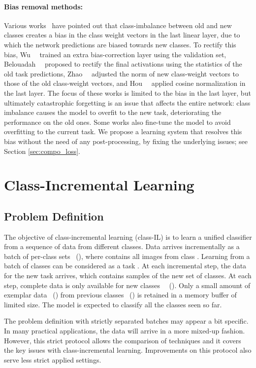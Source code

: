 \documentclass[final]{cvpr}
\begin{document}
\paragraph{Bias removal methods:}
Various works~\cite{lucir, bic, fairness} have pointed out that class-imbalance between old and new classes creates a bias in the class weight vectors in the last linear layer, due to which the network predictions are biased towards new classes.
To rectify this bias, Wu~\etal~\cite{bic} trained an extra bias-correction layer using the validation set, Belouadah~\etal~\cite{Belouadah_2019_ICCV} proposed to rectify the final activations using the statistics of the old task predictions, Zhao~\etal~\cite{fairness} adjusted the norm of new class-weight vectors to those of the old class-weight vectors, and 
Hou~\etal~\cite{lucir} applied cosine normalization in the last layer.
The focus of these works is limited to the bias in the last layer, but ultimately catastrophic forgetting is an issue that affects the entire network: class imbalance causes the model to overfit to the new task, deteriorating the performance on the old ones. 
Some works \cite{eeil, unlabeled} also fine-tune the model to avoid overfitting to the current task. We propose a learning system that resolves this bias without the need of any post-processing, by fixing the underlying issues; see Section \ref{sec:compo_loss}. 

 
 \section{Class-Incremental Learning}


\subsection{Problem Definition}
The objective of class-incremental learning (class-IL) is to learn a unified classifier from a sequence of data from different classes. Data arrives incrementally as a batch of per-class sets  \ie~(), where  contains all images from class . Learning from a batch of classes can be considered as a task . 
At each incremental step, the data for the new task  arrives, which contains samples of the new set of classes. 
At each step, complete data is only available for new classes ~\ie~(). Only a small amount of exemplar data  \ie~() from previous classes \ie~() is retained in a memory buffer of limited size. The model is expected to classify all the classes seen so far. 

The problem definition with strictly separated batches may appear a bit specific. In many practical applications, the data will arrive in a more mixed-up fashion. However, this strict protocol allows the comparison of techniques and it covers the key issues with class-incremental learning. Improvements on this protocol also serve less strict applied settings. 
\end{document}
